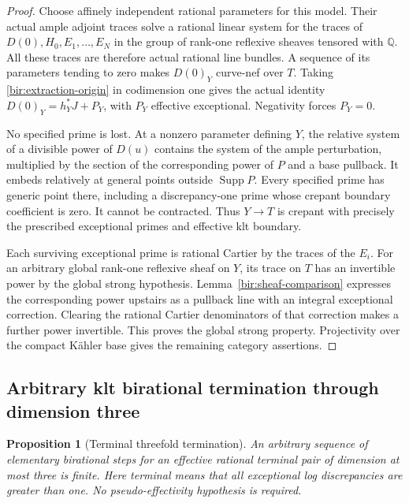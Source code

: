 \documentclass[11pt,letterpaper]{article}
\newcommand{\Q}{\mathbb{Q}}
\DeclareMathOperator{\Supp}{Supp}
\newtheorem{proposition}[theorem]{Proposition}
\theoremstyle{definition}
\theoremstyle{remark}
\begin{document}
\begin{proof}
Choose affinely independent rational parameters for this model.
Their actual ample adjoint traces solve a rational linear system for
the traces of $D(0),H_0,E_1,\ldots,E_N$ in the group of rank-one
reflexive sheaves tensored with $\Q$.  All these traces are therefore
actual rational line bundles.  A sequence of its parameters tending
to zero makes $D(0)_Y$ curve-nef over $T$.  Taking
\eqref{bir:extraction-origin} in codimension one gives the actual
identity $D(0)_Y=h_Y^*J+P_Y$, with $P_Y$ effective exceptional.
Negativity forces $P_Y=0$.

No specified prime is lost.  At a nonzero parameter defining $Y$,
the relative system of a divisible power of $D(u)$ contains the
system of the ample perturbation, multiplied by the section of the
corresponding power of $P$ and a base pullback.  It embeds relatively
at general points outside $\Supp P$.  Every specified prime has
generic point there, including a discrepancy-one prime whose
crepant boundary coefficient is zero.  It cannot be contracted.
Thus $Y\to T$ is crepant with precisely the prescribed exceptional
primes and effective klt boundary.

Each surviving exceptional prime is rational Cartier by the traces
of the $E_i$.  For an arbitrary global rank-one reflexive sheaf on
$Y$, its trace on $T$ has an invertible power by the global strong
hypothesis.  Lemma~\ref{bir:sheaf-comparison} expresses the
corresponding power upstairs as a pullback line with an integral
exceptional correction.  Clearing the rational Cartier denominators
of that correction makes a further power invertible.  This proves
the global strong property.  Projectivity over the compact K\"ahler
base gives the remaining category assertions.
\end{proof}

\subsection{Arbitrary klt birational termination through dimension three}
\label{bir:threefolds}

\begin{proposition}[Terminal threefold termination]
\label{bir:terminal-termination}
An arbitrary sequence of elementary birational steps for an effective
rational terminal pair of dimension at most three is finite.  Here
terminal means that all exceptional log discrepancies are greater
than one.  No pseudo-effectivity hypothesis is required.
\end{proposition}
\end{document}
